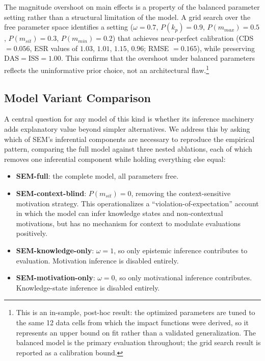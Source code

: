 \documentclass[12pt,a4paper]{article}
\begin{document}
The magnitude overshoot on main effects is a property of the balanced parameter
setting rather than a structural limitation of the model. A grid search over the
free parameter space identifies a setting ($\omega = 0.7$, $P(k_p) = 0.9$,
$P(m_{max}) = 0.5$, $P(m_{sit}) = 0.3$, $P(m_{min}) = 0.2$) that achieves
near-perfect calibration (CDS $= 0.056$, ESR values of $1.03$, $1.01$, $1.15$,
$0.96$; RMSE $= 0.165$), while preserving $\mathrm{DAS} = \mathrm{ISS} = 1.00$.
This confirms that the overshoot under balanced parameters reflects the
uninformative prior choice, not an architectural flaw.\footnote{This is an
in-sample, post-hoc result: the optimized parameters are tuned to the same 12
data cells from which the impact functions were derived, so it represents an
upper bound on fit rather than a validated generalization. The balanced model
is the primary evaluation throughout; the grid search result is reported as a
calibration bound.}


\subsection{Model Variant Comparison}
\label{sec:variants}

A central question for any model of this kind is whether its inference machinery
adds explanatory value beyond simpler alternatives. We address this by asking
which of SEM's inferential components are necessary to reproduce the empirical
pattern, comparing the full model against three nested ablations, each of which
removes one inferential component while holding everything else equal:

\begin{itemize}
\item \textbf{SEM-full}: the complete model, all parameters free.
\item \textbf{SEM-context-blind}: $P(m_{sit}) = 0$, removing the
context-sensitive motivation strategy. This operationalizes a
``violation-of-expectation'' account in which the model can infer knowledge
states and non-contextual motivations, but has no mechanism for context to
modulate evaluations positively.
\item \textbf{SEM-knowledge-only}: $\omega = 1$, so only epistemic inference
contributes to evaluation. Motivation inference is disabled entirely.
\item \textbf{SEM-motivation-only}: $\omega = 0$, so only motivational inference
contributes. Knowledge-state inference is disabled entirely.
\end{itemize}
\end{document}
